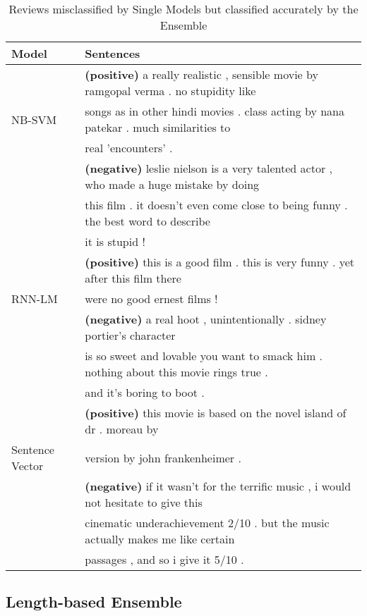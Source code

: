\documentclass{article} %
\begin{document}
\begin{table}[t]
\caption{Reviews misclassified by Single Models but classified accurately by the Ensemble}
\label{tab:sent}
\begin{center}
\begin{tabular}{ll}
\hline
Model & Sentences \\
\hline
& {\bf (positive)} a really realistic ,  sensible movie by ramgopal verma  .  no stupidity like \\
NB-SVM        & songs as in other hindi movies .  class acting by nana patekar .    much similarities to \\
        & real 'encounters' . \\
        & {\bf  (negative)} leslie nielson is a very talented actor ,  who made a huge mistake by doing \\
        & this film .  it doesn't even come close to being funny .  the best word to describe \\
        & it is  stupid ! \\
\hline
&  {\bf (positive)} this is a good film .  this is very funny .  yet after this film there \\
RNN-LM        & were no good ernest films ! \\
        & {\bf  (negative)} a real hoot ,  unintentionally .  sidney portier's character \\
        & is so sweet and lovable you want to smack him .  nothing about this movie rings true .\\
        &  and it's boring to boot . \\
\hline
& {\bf   (positive)} this movie is based on the novel island of dr .  moreau by \\
Sentence Vector
                    & version by john frankenheimer . \\
                    & {\bf  (negative)} if it wasn't for the terrific music ,  i would not hesitate to give this  \\
                    & cinematic underachievement 2/10 .  but the music actually makes me like certain \\ 
                    &passages ,  and so i give it 5/10 . \\
\hline
\end{tabular}
\end{center}
\end{table}

\iffalse
\subsection{Length-based Ensemble}
\end{document}
